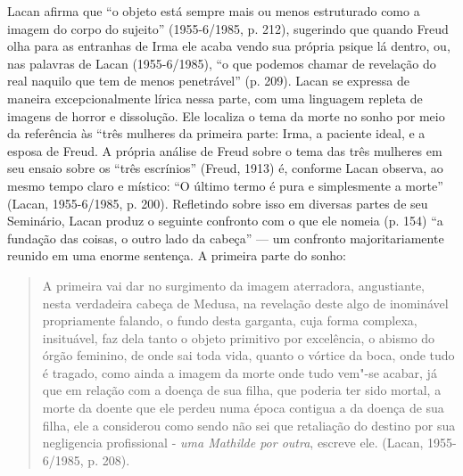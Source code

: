 Lacan afirma que ``o objeto está sempre mais ou menos estruturado como a
imagem do corpo do sujeito'' (1955-6/1985, p. 212), sugerindo que quando
Freud olha para as entranhas de Irma ele acaba vendo sua própria psique
lá dentro, ou, nas palavras de Lacan (1955-6/1985), ``o que podemos
chamar de revelação do real naquilo que tem de menos penetrável'' (p.
209). Lacan se expressa de maneira excepcionalmente lírica nessa parte,
com uma linguagem repleta de imagens de horror e dissolução. Ele
localiza o tema da morte no sonho por meio da referência às ``três
mulheres da primeira parte: Irma, a paciente ideal, e a esposa de Freud.
A própria análise de Freud sobre o tema das três mulheres em seu ensaio
sobre os ``três escrínios'' (Freud, 1913) é, conforme Lacan observa, ao
mesmo tempo claro e místico: ``O último termo é pura e simplesmente a
morte'' (Lacan, 1955-6/1985, p. 200). Refletindo sobre isso em diversas
partes de seu Seminário, Lacan produz o seguinte confronto com o que ele
nomeia (p. 154) ``a fundação das coisas, o outro lado da cabeça'' --- um
confronto majoritariamente reunido em uma enorme sentença. A primeira
parte do sonho:

\begin{quote}
A primeira vai dar no surgimento da imagem aterradora, angustiante,
nesta verdadeira cabeça de Medusa, na revelação deste algo de inominável
propriamente falando, o fundo desta garganta, cuja forma complexa,
insituável, faz dela tanto o objeto primitivo por excelência, o abismo
do órgão feminino, de onde sai toda vida, quanto o vórtice da boca, onde
tudo é tragado, como ainda a imagem da morte onde tudo vem"-se acabar, já
que em relação com a doença de sua filha, que poderia ter sido mortal, a
morte da doente que ele perdeu numa época contigua a da doença de sua
filha, ele a considerou como sendo não sei que retaliação do destino por
sua negligencia profissional - \emph{uma Mathilde por outra}, escreve
ele. (Lacan, 1955-6/1985, p. 208).
\end{quote}

